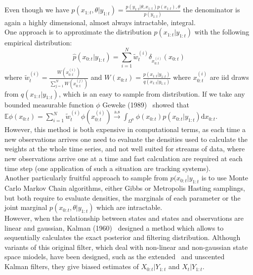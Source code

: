 \documentclass{article}
\begin{document}
	Even though we have $p(x_{1:t}, \theta|y_{1:t}) = \frac{p(y_{1:t}|\theta, x_{1:t})p(x_{1:t}), \theta}{p(y_{1:t})}$ the denominator is again a highly dimensional, almost always intractable, integral. \\
	One approach is to approximate the distribution $p(x_{1:t}|y_{1:t})$ with the following empirical distribution:
	\begin{equation}
		\hat{p}(x_{0:t}|y_{1:t}) = \sum_{i=1}^{N}\tilde{w}_t^{(i)} \delta_{x_{0:t}^{(i)}}(x_{0:t})
	\end{equation}
	where $\tilde{w}_t^{(i)} = \frac{W(x_{0:t}^{(i)})}{\sum_{j=1}^{N} W(x_{0:t}^{(j)})}$ and $W(x_{0:t}) = \frac{p(x_{1:t}|y_{1:t})}{q(x_{1:t}|y_{1:t})}$ where $x_{0:t}^{(i)}$ are iid draws from $q(x_{1:t}|y_{1:t})$, which is an easy to sample from distribution. If we take any bounded measurable function $\phi$ Geweke (1989)~\cite{Geweke1989} showed that $\mathbb{E}\phi(x_{0:t}) = \sum_{i=1}^{N} \tilde{w}_t^{(i)} \phi(x_{0:t}^{(i)}) \xrightarrow{\mathrm{a.s}} \int_{\Omega^n} \phi({x_{0:t}})p(x_{0:t}|y_{1:t})\mathrm{d}x_{0:t}$. \\
	
	However, this method is both expensive in computational terms, as each time a new observations arrives one need to evaluate the densities used to calculate the weights at the whole time series, and not well suited for streams of data, where new observations arrive one at a time and fast calculation are required at each time step (one application of such a situation are tracking systems). \\
	Another particularly fruitful approach to sample from $p(x_{0:t}|y_{1:t}$ is to use Monte Carlo Markov Chain algorithms, either Gibbs or Metropolis Hasting samplings, but both require to evaluate densities, the marginals of each parameter or the joint marginal $p(x_{0:t}, \theta | y_{1:t})$  which are intractable. \\
	
	However, when the relationship between states and states and observations are linear and gaussian, Kalman (1960)~\cite{Kalman1960} designed a method which allows to sequentially calculates the exact posterior and filtering distribution. Although variants of this original filter, which deal with non-linear and non-gaussian state space miodels, have been designed, such as the extended~\cite{McElhoe1966} and unscented~\cite{Julier1997} Kalman filters, they give biased estimates of $X_{0:t}|Y_{1:t}$ and $X_{t}|Y_{1:t}$. 
	
\end{document}

